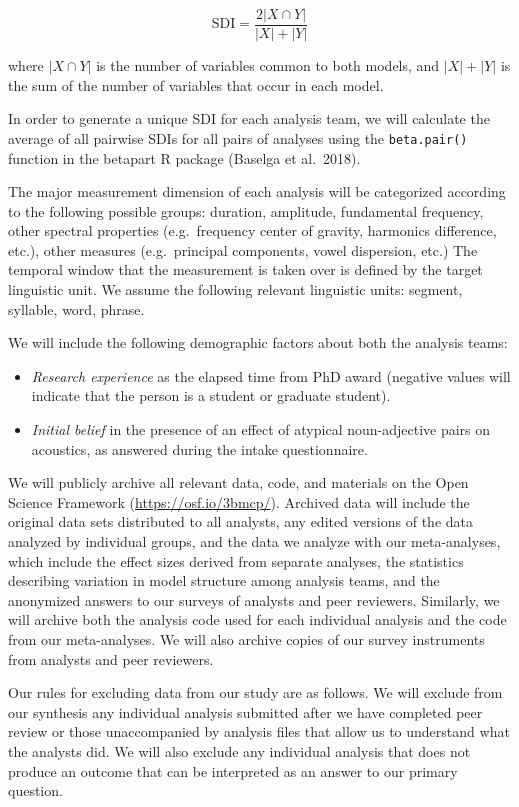 \documentclass[
  english,
  man]{apa6}
\providecommand{\tightlist}{%
  \setlength{\itemsep}{0pt}\setlength{\parskip}{0pt}}
\begin{document}
\[\text{SDI} = \frac{2|X \cap Y|}{|X|+|Y|}\]

where \(|X \cap Y|\) is the number of variables common to both models, and \(|X|+|Y|\) is the sum of the number of variables that occur in each model.

In order to generate a unique SDI for each analysis team, we will calculate the average of all pairwise SDIs for all pairs of analyses using the \texttt{beta.pair()} function in the betapart R package (Baselga et al.~2018).

The major measurement dimension of each analysis will be categorized according to the following possible groups: duration, amplitude, fundamental frequency, other spectral properties (e.g.~frequency center of gravity, harmonics difference, etc.), other measures (e.g.~principal components, vowel dispersion, etc.)
The temporal window that the measurement is taken over is defined by the target linguistic unit.
We assume the following relevant linguistic units: segment, syllable, word, phrase.

We will include the following demographic factors about both the analysis teams:

\begin{itemize}
\tightlist
\item
  \emph{Research experience} as the elapsed time from PhD award (negative values will indicate that the person is a student or graduate student).
\item
  \emph{Initial belief} in the presence of an effect of atypical noun-adjective pairs on acoustics, as answered during the intake questionnaire.
\end{itemize}

We will publicly archive all relevant data, code, and materials on the Open Science Framework (\url{https://osf.io/3bmcp/}).
Archived data will include the original data sets distributed to all analysts, any edited versions of the data analyzed by individual groups, and the data we analyze with our meta-analyses, which include the effect sizes derived from separate analyses, the statistics describing variation in model structure among analysis teams, and the anonymized answers to our surveys of analysts and peer reviewers.
Similarly, we will archive both the analysis code used for each individual analysis and the code from our meta-analyses.
We will also archive copies of our survey instruments from analysts and peer reviewers.

Our rules for excluding data from our study are as follows.
We will exclude from our synthesis any individual analysis submitted after we have completed peer review or those unaccompanied by analysis files that allow us to understand what the analysts did.
We will also exclude any individual analysis that does not produce an outcome that can be interpreted as an answer to our primary question.
\end{document}
